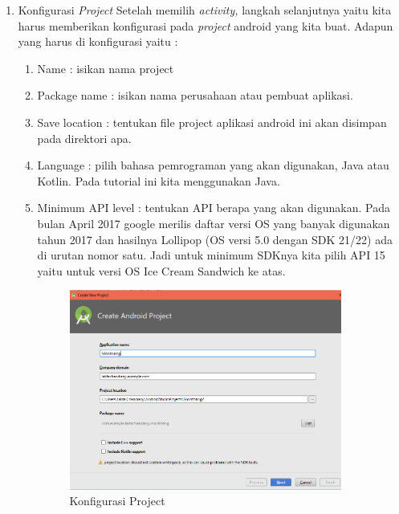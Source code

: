 \begin{enumerate}
    \item Konfigurasi \textit{Project}
    Setelah memilih \textit{activity,} langkah selanjutnya yaitu kita harus memberikan konfigurasi pada \textit{project} android yang kita buat. Adapun yang harus di konfigurasi yaitu :
    \begin{enumerate}
        \item Name : isikan nama project
        \item Package name : isikan nama perusahaan atau pembuat aplikasi.
        \item Save location : tentukan file project aplikasi android ini akan disimpan pada direktori apa.
        \item Language : pilih bahasa pemrograman yang akan digunakan, Java atau Kotlin. Pada tutorial ini kita menggunakan Java.
        \item Minimum API level : tentukan API berapa yang akan digunakan. Pada bulan April 2017 google merilis daftar versi OS yang banyak digunakan tahun 2017 dan hasilnya Lollipop (OS versi 5.0 dengan SDK 21/22) ada di urutan nomor satu. Jadi untuk minimum SDKnya kita pilih API 15 yaitu untuk versi OS Ice Cream Sandwich ke atas.
        \begin{figure}[H]
        \centering
        \includegraphics[width=0.9\textwidth]{figures/android25.png}
        \caption{Konfigurasi Project}
        \label{print}
        \end{figure}
        

\end{enumerate}
\end{enumerate}
